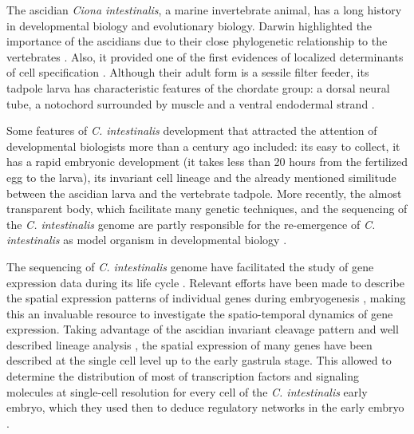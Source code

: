 
	The ascidian \textit{Ciona intestinalis}, a marine invertebrate animal, has a long history in developmental biology and evolutionary biology. 
	Darwin highlighted the importance of the ascidians due to their close phylogenetic relationship to the vertebrates \citep{Darwin20009}. Also, it provided one of the first evidences of localized determinants of cell specification \citep{Conklin1905}. Although their adult form is a sessile filter feeder, its tadpole larva has characteristic features of the chordate group: a dorsal neural tube, a notochord surrounded by muscle and a ventral endodermal strand \cite{Satoh2003}.
	
	Some features of \textit{C. intestinalis} development that attracted the attention of developmental biologists more than a century ago \citep{kowalewski1866entwicklungsgeschichte,chabry1887contribution} included: its easy to collect, it has a rapid embryonic development (it takes less than 20 hours from the fertilized egg to the larva), its invariant cell lineage and the already mentioned similitude between the ascidian larva and the vertebrate tadpole.
	More recently, the almost transparent body, which facilitate many genetic techniques, and the sequencing of the \textit{C. intestinalis} genome \citep{Dehal2002} are partly responsible for the re-emergence of \textit{C. intestinalis} as model organism in developmental biology \citep{Levin2012}.
	
The sequencing of \textit{C. intestinalis} genome have facilitated the study of gene expression data during its life cycle \citep{Azumi2007}. Relevant efforts have been made to describe the spatial expression patterns of individual genes during embryogenesis \citep{Satou2001,Fujiwara2002,Kusakabe2002,Imai2004,Miwata2006}, making this an invaluable resource to investigate the spatio-temporal dynamics of gene expression. Taking advantage of the ascidian invariant cleavage pattern and well described lineage analysis \citep{Conklin1905,Nishida1987}, the spatial expression of many genes have been described at the single cell level up to the early gastrula stage.
This allowed \citet{Imai2006} to determine the distribution of most of transcription factors and signaling molecules at single-cell resolution for every cell of the \textit{C. intestinalis} early embryo, which they used then to deduce regulatory networks in the early embryo \citep{Imai2006}.


